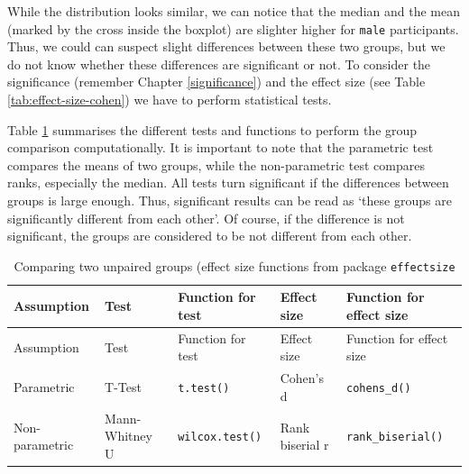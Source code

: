 \documentclass[
]{book}
\begin{document}
While the distribution looks similar, we can notice that the median and the mean (marked by the cross inside the boxplot) are slighter higher for \texttt{male} participants. Thus, we could can suspect slight differences between these two groups, but we do not know whether these differences are significant or not. To consider the significance (remember Chapter \ref{significance}) and the effect size (see Table \ref{tab:effect-size-cohen}) we have to perform statistical tests.

Table \ref{tab:comparing-two-groups-unpaired} summarises the different tests and functions to perform the group comparison computationally. It is important to note that the parametric test compares the means of two groups, while the non-parametric test compares ranks, especially the median. All tests turn significant if the differences between groups is large enough. Thus, significant results can be read as `these groups are significantly different from each other'. Of course, if the difference is not significant, the groups are considered to be not different from each other.

\begin{longtable}[]{@{}lllll@{}}
\caption{\label{tab:comparing-two-groups-unpaired} Comparing two unpaired groups (effect size functions from package \texttt{effectsize}}\tabularnewline
\toprule
Assumption & Test & Function for test & Effect size & Function for effect size \\
\midrule
\endfirsthead
\toprule
Assumption & Test & Function for test & Effect size & Function for effect size \\
\midrule
\endhead
Parametric & T-Test & \texttt{t.test()} & Cohen's d & \texttt{cohens\_d()} \\
Non-parametric & Mann-Whitney U & \texttt{wilcox.test()} & Rank biserial r & \texttt{rank\_biserial()} \\
\bottomrule
\end{longtable}
\end{document}
